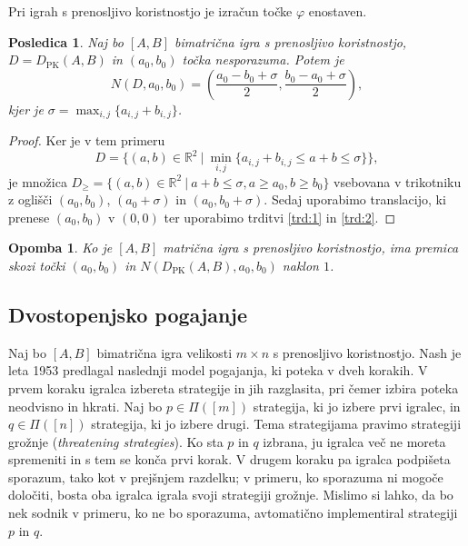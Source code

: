 \documentclass[10pt, a4paper]{article}
\newtheorem{posledica}[izr]{Posledica}
\newtheorem*{opomba}{Opomba}
\newenvironment{noticeC}{%
  \tcolorbox[%
  notitle,
  empty,
  enhanced,  %
  breakable,
  coltext=black, 
  fontupper=\rmfamily,
  parbox=false,
  noparskip,
  sharp corners,
  boxrule=-1pt,  %
  frame hidden,
  left=7pt,  %
  right=7pt,
  top=5pt,
  bottom=5pt,
  before skip=2.5ex plus 2pt,
  after skip=2.5ex plus 2pt,
  overlay unbroken and last={%
  },
  ]}
{\endtcolorbox}
\newenvironment{dokaz}%
  {\begin{noticeC}\begin{proof}}%
  {\end{proof}\end{noticeC}}
\newcommand{\R}{\mathbb {R}}
\begin{document}
Pri igrah s prenosljivo koristnostjo je izračun točke $\varphi$ enostaven.

\begin{posledica}\label{pos:2}
  Naj bo $[A, B]$ bimatrična igra s prenosljivo koristnostjo, $D = D_{\mathrm{PK}} (A, B)$
  in $(a_0, b_0)$ točka nesporazuma. Potem je 
  $$N(D, a_0, b_0) = \left(\frac{a_0 - b_0 + \sigma}{2}, \frac{b_0 - a_0 + \sigma}{2}\right),$$
  kjer je $\sigma = \max_{i, j} \{a_{i, j} + b_{i, j}\}$.
\end{posledica}

\begin{dokaz}
  Ker je v tem primeru 
  $$D = \{(a, b) \in \R^2\ |\ \min_{i, j} \{a_{i, j} + b_{i, j} \leq a + b \leq \sigma\}\},$$
  je množica $D_\geq = \{(a, b) \in \R^2\ |\ a + b \leq \sigma, a \geq a_0, b\geq b_0\}$
  vsebovana v trikotniku z oglišči $(a_0, b_0)$, $(a_0 + \sigma)$ in $(a_0, b_0 + \sigma)$.
  Sedaj uporabimo translacijo, ki prenese $(a_0, b_0)$ v $(0, 0)$ ter uporabimo trditvi \ref{trd:1} in \ref{trd:2}.
\end{dokaz}

\begin{opomba}
  Ko je $[A, B]$ matrična igra s prenosljivo koristnostjo, ima premica skozi 
  točki $(a_0, b_0)$ in $N(D_{\mathrm{PK}} (A, B), a_0, b_0)$ naklon $1$.
\end{opomba}

\subsection{Dvostopenjsko pogajanje}

Naj bo $[A, B]$ bimatrična igra velikosti $m \times n$ s prenosljivo koristnostjo.
Nash je leta 1953 predlagal naslednji model pogajanja, ki poteka v dveh korakih.
V prvem koraku igralca izbereta strategije in jih razglasita, pri čemer izbira poteka neodvisno in hkrati.
Naj bo $p \in \Pi([m])$ strategija, ki jo izbere prvi igralec,
in $q \in \Pi([n])$ strategija, ki jo izbere drugi. Tema strategijama pravimo 
strategiji grožnje (\emph{threatening strategies}). Ko sta $p$ in $q$ izbrana,
ju igralca več ne moreta spremeniti in s tem se konča prvi korak.
V drugem koraku pa igralca podpišeta sporazum, tako kot v prejšnjem razdelku;
v primeru, ko sporazuma ni mogoče določiti, bosta oba igralca igrala svoji strategiji grožnje.
Mislimo si lahko, da bo nek sodnik v primeru, ko ne bo sporazuma, avtomatično implementiral
strategiji $p$ in $q$.
\end{document}
